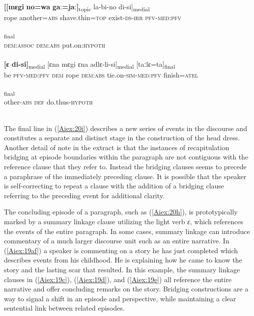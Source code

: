 \documentclass[output=paper]{LSP/langsci}
\begin{document}
\begin{exe}
\begin{xlist}
\ex \label{Aiex:20f}
\gll \textbf{[[mɛgi}	\textbf{no=wa}	\textbf{gaː=jaː]}\textsubscript{topic}	la-bi-no	di-si]\textsubscript{medial}\\
rope	another\textsc{=abs}	shave.thin\textsc{=top}	exist\textsc{-ds-irr}	\textsc{pfv-med:pfv}\\
\glt {}\\
\ex \label{Aiex:20g}
\textsubscript{final}\\
\textsc{dem:assoc}	\textsc{dem:abs}	put.on\textsc{:hypoth}\\
\glt {}\\
\ex \label{Aiex:20h}
\gll \textbf{[ɛ	di-si]}\textsubscript{medial}	[ɛna	mɛgi	ɛna	adlɛ-li-si]\textsubscript{medial}	[taːlɛ=ta]\textsubscript{final}\\
be	\textsc{pfv-med:pfv}	\textsc{dem}	rope	\textsc{dem:abs}	tie.on\textsc{-sim-med:pfv}	finish\textsc{=atel}\\
\glt {}\\
\ex \label{Aiex:20i}
\textsubscript{final}\\
other\textsc{-abs}	\textsc{def}	do.thus\textsc{-hypoth}\\
\glt {}\\
\end{xlist}
\end{exe}

	The final line in (\ref{Aiex:20i}) describes a new series of events in the discourse and constitutes a separate and distinct stage in the construction of the head dress. Another detail of note in the extract is that the instances of recapitulation bridging at episode boundaries within the paragraph are not contiguous with the reference clause that they refer to. Instead the bridging clauses seems to precede a paraphrase of the immediately preceding clause. It is possible that the speaker is self-correcting to repeat a clause with the addition of a bridging clause referring to the preceding event for additional clarity.
	

	The concluding episode of a paragraph, such as (\ref{Aiex:20h}), is prototypically marked by a summary linkage clause utilizing the light verb \textit{ɛ}, which references the events of the entire paragraph. In some cases, summary linkage can introduce commentary of a much larger discourse unit such as an entire narrative. In (\ref{Aiex:19af}) a speaker is commenting on a story he has just completed which describes events from his childhood. He is explaining how he came to know the story and the lasting scar that resulted. In this example, the summary linkage clauses in (\ref{Aiex:19c}), (\ref{Aiex:19d}), and (\ref{Aiex:19e}) all reference the entire narrative and offer concluding remarks on the story. Bridging constructions are a way to signal a shift in an episode and perspective, while maintaining a clear sentential link between related episodes. 
	
\end{document}
